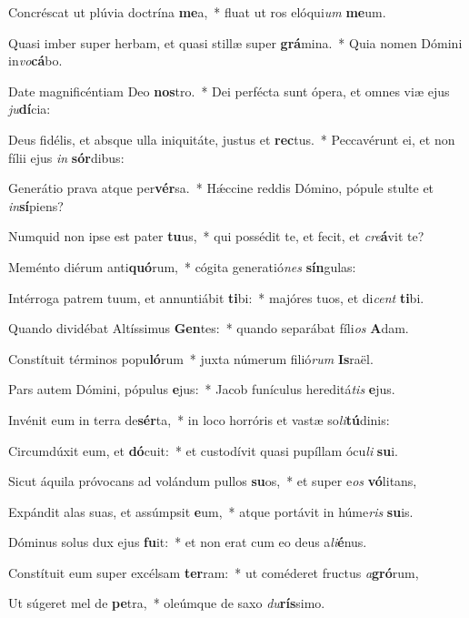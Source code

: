 \item Concréscat ut plúvia doctrína \textbf{me}a,~* fluat ut ros elóqui\textit{um} \textbf{me}um.
\item Quasi imber super herbam, et quasi stillæ super \textbf{grá}mina.~* Quia nomen Dómini in\textit{vo}\textbf{cá}bo.
\item Date magnificéntiam Deo \textbf{nos}tro.~* Dei perfécta sunt ópera, et omnes viæ ejus \textit{ju}\textbf{dí}cia:
\item Deus fidélis, et absque ulla iniquitáte, justus et \textbf{rec}tus.~* Peccavérunt ei, et non fílii ejus \textit{in} \textbf{sór}dibus:
\item Generátio prava atque per\textbf{vér}sa.~* Hǽccine reddis Dómino, pópule stulte et \textit{in}\textbf{sí}piens?
\item Numquid non ipse est pater \textbf{tu}us,~* qui possédit te, et fecit, et \textit{cre}\textbf{á}vit te?
\item Meménto diérum anti\textbf{quó}rum,~* cógita generatió\textit{nes} \textbf{sín}gulas:
\item Intérroga patrem tuum, et annuntiábit \textbf{ti}bi:~* majóres tuos, et di\textit{cent} \textbf{ti}bi.
\item Quando dividébat Altíssimus \textbf{Gen}tes:~* quando separábat fíli\textit{os} \textbf{A}dam.
\item Constítuit términos popu\textbf{ló}rum~* juxta númerum filió\textit{rum} \textbf{Is}raël.
\item Pars autem Dómini, pópulus \textbf{e}jus:~* Jacob funículus hereditá\textit{tis} \textbf{e}jus.
\item Invénit eum in terra de\textbf{sér}ta,~* in loco horróris et vastæ so\textit{li}\textbf{tú}dinis:
\item Circumdúxit eum, et \textbf{dó}cuit:~* et custodívit quasi pupíllam ócu\textit{li} \textbf{su}i.
\item Sicut áquila próvocans ad volándum pullos \textbf{su}os,~* et super e\textit{os} \textbf{vó}litans,
\item Expándit alas suas, et assúmpsit \textbf{e}um,~* atque portávit in húme\textit{ris} \textbf{su}is.
\item Dóminus solus dux ejus \textbf{fu}it:~* et non erat cum eo deus a\textit{li}\textbf{é}nus.
\item Constítuit eum super excélsam \textbf{ter}ram:~* ut coméderet fructus \textit{a}\textbf{gró}rum,
\item Ut súgeret mel de \textbf{pe}tra,~* oleúmque de saxo \textit{du}\textbf{rís}simo.

